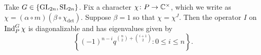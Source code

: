 \begin{theorem} \label{thm:eigens-gl}
    Take $G\in\{\mathrm{GL}_{2n},\mathrm{SL}_{2n}\}$. Fix a character $\chi\colon P\to\mathbb C^\times$, which we write as $\chi=(\alpha\circ m)(\beta\circ\chi_{\det})$. Suppose $\beta=1$ so that $\chi=\chi^J$. Then the operator $I$ on $\operatorname{Ind}_P^G\chi$ is diagonalizable and has eigenvalues given by
    \[\left\{(-1)^{n-i}q^{\binom n2+\binom{i+1}2}:0\le i\le n\right\}.\]
\end{theorem}
